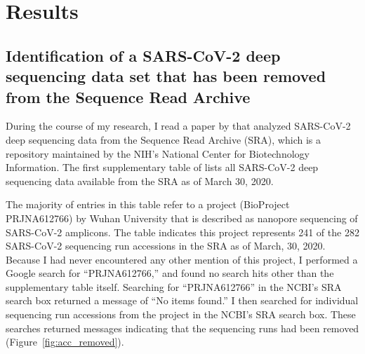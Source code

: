 \documentclass[9pt,twocolumn,twoside]{gsajnl_modified}
\begin{document}
\section{Results}

\subsection{Identification of a SARS-CoV-2 deep sequencing data set that has been removed from the Sequence Read Archive}
During the course of my research, I read a paper by \citet{farkas2020insights} that analyzed SARS-CoV-2 deep sequencing data from the Sequence Read Archive (SRA), which is a repository maintained by the NIH's National Center for Biotechnology Information.
The first supplementary table of \citet{farkas2020insights} lists all SARS-CoV-2 deep sequencing data available from the SRA as of March 30, 2020.

The majority of entries in this table refer to a project (BioProject PRJNA612766) by Wuhan University that is described as nanopore sequencing of SARS-CoV-2 amplicons.
The table indicates this project represents 241 of the 282 SARS-CoV-2 sequencing run accessions in the SRA as of March, 30, 2020.
Because I had never encountered any other mention of this project, I performed a Google search for ``PRJNA612766,'' and found no search hits other than the supplementary table itself.
Searching for ``PRJNA612766'' in the NCBI's SRA search box returned a message of ``No items found.''
I then searched for individual sequencing run accessions from the project in the NCBI's SRA search box.
These searches returned messages indicating that the sequencing runs had been removed (Figure~\ref{fig:acc_removed}).
\end{document}

